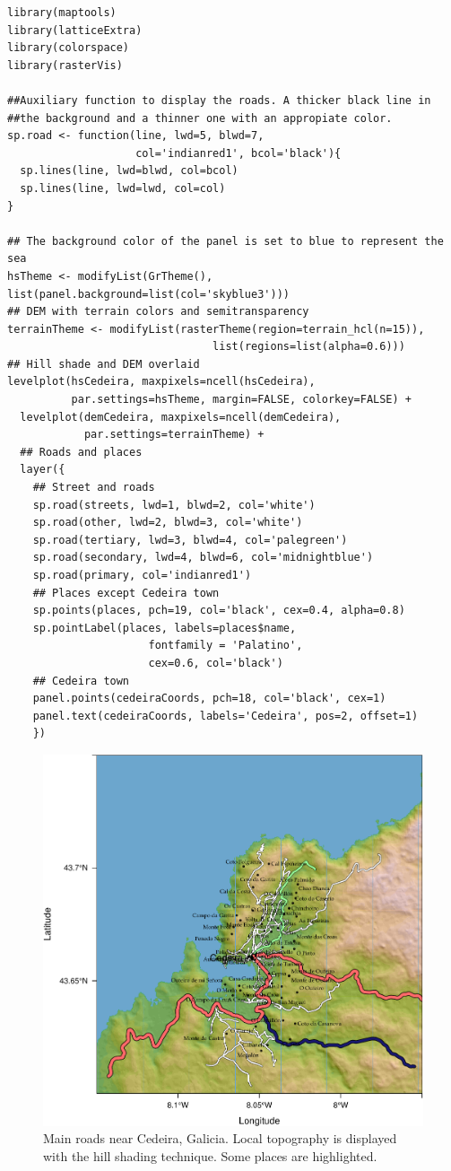 \lstset{language=R}
\begin{lstlisting}
library(maptools)
library(latticeExtra)
library(colorspace)
library(rasterVis)

##Auxiliary function to display the roads. A thicker black line in
##the background and a thinner one with an appropiate color.
sp.road <- function(line, lwd=5, blwd=7,
                    col='indianred1', bcol='black'){
  sp.lines(line, lwd=blwd, col=bcol)
  sp.lines(line, lwd=lwd, col=col)
}

## The background color of the panel is set to blue to represent the sea
hsTheme <- modifyList(GrTheme(), list(panel.background=list(col='skyblue3')))
## DEM with terrain colors and semitransparency
terrainTheme <- modifyList(rasterTheme(region=terrain_hcl(n=15)),
                                list(regions=list(alpha=0.6)))
## Hill shade and DEM overlaid
levelplot(hsCedeira, maxpixels=ncell(hsCedeira),
          par.settings=hsTheme, margin=FALSE, colorkey=FALSE) +
  levelplot(demCedeira, maxpixels=ncell(demCedeira),
            par.settings=terrainTheme) +
  ## Roads and places
  layer({
    ## Street and roads
    sp.road(streets, lwd=1, blwd=2, col='white')
    sp.road(other, lwd=2, blwd=3, col='white')
    sp.road(tertiary, lwd=3, blwd=4, col='palegreen')
    sp.road(secondary, lwd=4, blwd=6, col='midnightblue')
    sp.road(primary, col='indianred1')
    ## Places except Cedeira town
    sp.points(places, pch=19, col='black', cex=0.4, alpha=0.8)
    sp.pointLabel(places, labels=places$name,
                      fontfamily = 'Palatino', 
                      cex=0.6, col='black')
    ## Cedeira town
    panel.points(cedeiraCoords, pch=18, col='black', cex=1)
    panel.text(cedeiraCoords, labels='Cedeira', pos=2, offset=1)
    })
\end{lstlisting}

\begin{figure}[htb]
\centering
\includegraphics[width=.9\linewidth]{figs/cedeiraOsmar.pdf}
\caption{\label{fig:cedeiraOsmar}Main roads near Cedeira, Galicia. Local topography is displayed with the hill shading technique. Some places are highlighted.}
\end{figure}
